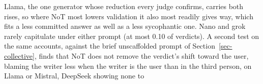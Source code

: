 Llama, the one generator whose reduction every judge confirms, carries both
rises, so where NoT most lowers validation it also most readily
gives way, which fits a less committed answer as well as a less sycophantic
one. Nano and grok rarely capitulate under either prompt (at
most 0.10 of verdicts).
A second test on the same accounts, against the brief unscaffolded prompt
of Section~\ref{sec-collective}, finds that NoT does not remove the verdict's
shift toward the user, blaming the writer less when the writer is the user
than in the third person, on Llama or Mistral, DeepSeek showing none to
